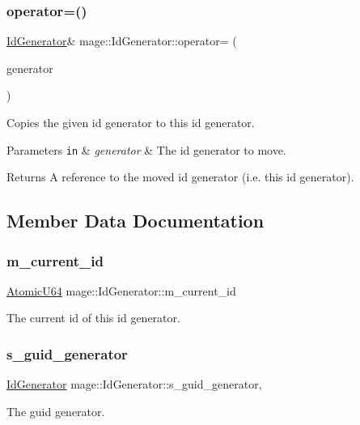 \subsubsection{\texorpdfstring{operator=()}{operator=()}\hspace{0.1cm}{\footnotesize\ttfamily [2/2]}}
{\footnotesize\ttfamily \mbox{\hyperlink{classmage_1_1_id_generator}{Id\+Generator}}\& mage\+::\+Id\+Generator\+::operator= (\begin{DoxyParamCaption}\item[{\mbox{\hyperlink{classmage_1_1_id_generator}{Id\+Generator}} \&\&}]{generator }\end{DoxyParamCaption})\hspace{0.3cm}{\ttfamily [delete]}}

Copies the given id generator to this id generator.


\begin{DoxyParams}[1]{Parameters}
\mbox{\tt in}  & {\em generator} & The id generator to move. \\
\hline
\end{DoxyParams}
\begin{DoxyReturn}{Returns}
A reference to the moved id generator (i.\+e. this id generator). 
\end{DoxyReturn}


\subsection{Member Data Documentation}
\mbox{\label{classmage_1_1_id_generator_ab8c5396d9050530ce030b3c8e2f6b62f}} 
\subsubsection{\texorpdfstring{m\+\_\+current\+\_\+id}{m\_current\_id}}
{\footnotesize\ttfamily \mbox{\hyperlink{namespacemage_a694beb1edf301f410ce0b33c96b09871}{Atomic\+U64}} mage\+::\+Id\+Generator\+::m\+\_\+current\+\_\+id\hspace{0.3cm}{\ttfamily [private]}}

The current id of this id generator. \mbox{\label{classmage_1_1_id_generator_aae064239698f2a64515bc0e91ff9a303}} 
\subsubsection{\texorpdfstring{s\+\_\+guid\+\_\+generator}{s\_guid\_generator}}
{\footnotesize\ttfamily \mbox{\hyperlink{classmage_1_1_id_generator}{Id\+Generator}} mage\+::\+Id\+Generator\+::s\+\_\+guid\+\_\+generator\hspace{0.3cm}{\ttfamily [static]}, {\ttfamily [private]}}

The guid generator. 